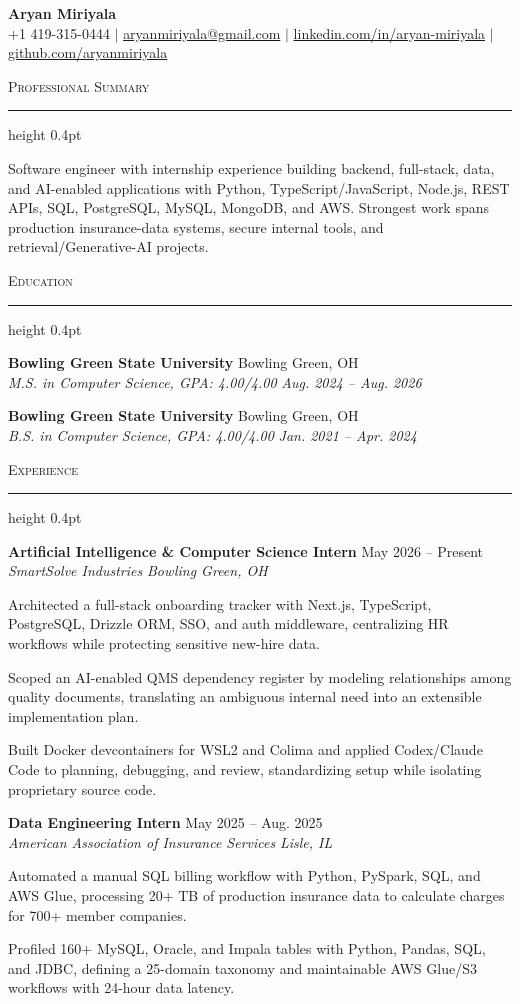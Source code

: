 \documentclass[letterpaper,11pt]{article}
\newcommand{\resumesection}[1]{%
  \par\vspace{2pt}%
  {\large\scshape #1}\par\vspace{2pt}%
  \hrule height 0.4pt\vspace{2pt}%
}
\newcommand{\resumeSubheading}[4]{
  \textbf{#1} \hfill #2\\
  \textit{#3} \hfill \textit{#4}
}
\begin{document}
\begin{center}
  {\LARGE \textbf{Aryan Miriyala}}\\[-1pt]
  \small
  +1 419-315-0444 $|$
  \href{mailto:aryanmiriyala@gmail.com}{aryanmiriyala@gmail.com} $|$
  \href{https://www.linkedin.com/in/aryan-miriyala-7788a21b6/}{linkedin.com/in/aryan-miriyala} $|$
  \href{https://github.com/aryanmiriyala}{github.com/aryanmiriyala}
\end{center}\vspace{-10pt}

\resumesection{Professional Summary}
Software engineer with internship experience building backend, full-stack, data, and AI-enabled applications with Python, TypeScript/JavaScript, Node.js, REST APIs, SQL, PostgreSQL, MySQL, MongoDB, and AWS. Strongest work spans production insurance-data systems, secure internal tools, and retrieval/Generative-AI projects.

\resumesection{Education}
\resumeSubheading
{Bowling Green State University}{Bowling Green, OH}
{M.S. in Computer Science, GPA: 4.00/4.00}{Aug. 2024 -- Aug. 2026}

\resumeSubheading
{Bowling Green State University}{Bowling Green, OH}
{B.S. in Computer Science, GPA: 4.00/4.00}{Jan. 2021 -- Apr. 2024}

\resumesection{Experience}
\resumeSubheading
{Artificial Intelligence \& Computer Science Intern}{May 2026 -- Present}
{SmartSolve Industries}{Bowling Green, OH}
\begin{tightitemize}
  \item Architected a full-stack onboarding tracker with Next.js, TypeScript, PostgreSQL, Drizzle ORM, SSO, and auth middleware, centralizing HR workflows while protecting sensitive new-hire data.
  \item Scoped an AI-enabled QMS dependency register by modeling relationships among quality documents, translating an ambiguous internal need into an extensible implementation plan.
  \item Built Docker devcontainers for WSL2 and Colima and applied Codex/Claude Code to planning, debugging, and review, standardizing setup while isolating proprietary source code.
\end{tightitemize}

\resumeSubheading
{Data Engineering Intern}{May 2025 -- Aug. 2025}
{American Association of Insurance Services}{Lisle, IL}
\begin{tightitemize}
  \item Automated a manual SQL billing workflow with Python, PySpark, SQL, and AWS Glue, processing 20+ TB of production insurance data to calculate charges for 700+ member companies.
  \item Profiled 160+ MySQL, Oracle, and Impala tables with Python, Pandas, SQL, and JDBC, defining a 25-domain taxonomy and maintainable AWS Glue/S3 workflows with 24-hour data latency.
\end{tightitemize}
\end{document}
